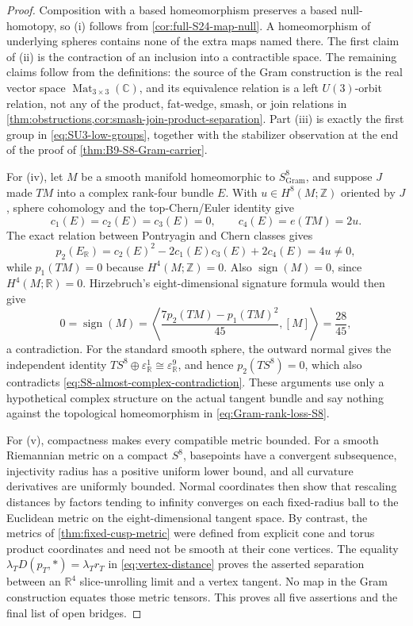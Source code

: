 \documentclass[11pt,letterpaper]{article}
\numberwithin{equation}{section}
\theoremstyle{definition}
\theoremstyle{remark}
\newcommand{\R}{\mathbb R}
\newcommand{\C}{\mathbb C}
\newcommand{\Z}{\mathbb Z}
\begin{document}
\begin{proof}
Composition with a based homeomorphism preserves a based null-homotopy,
so (i) follows from \cref{cor:full-S24-map-null}.  A homeomorphism of
underlying spheres contains none of the extra maps named there.  The first
claim of (ii) is the contraction of an inclusion into a contractible
space.  The remaining claims follow from the definitions: the source of
the Gram construction is the real vector space
\(\operatorname{Mat}_{3\times3}(\C)\), and its equivalence relation is a
left \(U(3)\)-orbit relation, not any of the product, fat-wedge, smash, or
join relations in
\cref{thm:obstructions,cor:smash-join-product-separation}.
Part (iii) is exactly the first group in
\cref{eq:SU3-low-groups}, together with the stabilizer observation at the
end of the proof of \cref{thm:B9-S8-Gram-carrier}.

For (iv), let \(M\) be a smooth manifold homeomorphic to
\(S^8_{\mathrm{Gram}}\), and suppose \(J\) made \(TM\) into a complex
rank-four bundle \(E\).  With \(u\in H^8(M;\Z)\) oriented by \(J\), sphere
cohomology and the top-Chern/Euler identity give
\[
 c_1(E)=c_2(E)=c_3(E)=0,
 \qquad c_4(E)=e(TM)=2u.
\]
The exact relation between Pontryagin and Chern classes gives
\begin{equation}
 p_2(E_\R)=c_2(E)^2-2c_1(E)c_3(E)+2c_4(E)=4u\ne0,
 \label{eq:S8-almost-complex-contradiction}
\end{equation}
while \(p_1(TM)=0\) because \(H^4(M;\Z)=0\).  Also
\(\operatorname{sign}(M)=0\), since \(H^4(M;\R)=0\).  Hirzebruch's
eight-dimensional signature formula would then give
\[
 0=\operatorname{sign}(M)
 =\left\langle\frac{7p_2(TM)-p_1(TM)^2}{45},[M]\right\rangle
 =\frac{28}{45},
\]
a contradiction.  For the standard smooth sphere, the outward normal
gives the independent identity
\(TS^8\oplus\varepsilon^1_\R\cong\varepsilon^9_\R\), and hence
\(p_2(TS^8)=0\), which also contradicts
\cref{eq:S8-almost-complex-contradiction}.  These arguments use only a
hypothetical complex structure on the actual tangent bundle and say
nothing against the topological homeomorphism in
\cref{eq:Gram-rank-loss-S8}.

For (v), compactness makes every compatible metric bounded.  For a smooth
Riemannian metric on a compact \(S^8\), basepoints have a convergent
subsequence, injectivity radius has a positive uniform lower bound, and all
curvature derivatives are uniformly bounded.  Normal coordinates then
show that rescaling distances by factors tending to infinity converges on
each fixed-radius ball to the Euclidean metric on the eight-dimensional
tangent space.  By contrast, the metrics of
\cref{thm:fixed-cusp-metric} were defined from explicit cone and torus
product coordinates and need not be smooth at their cone vertices.
The equality \(\lambda_TD(p_T,*)=\lambda_Tr_T\) in
\cref{eq:vertex-distance} proves the asserted separation between an
\(\R^4\) slice-unrolling limit and a vertex tangent.
No map in the Gram construction equates those metric tensors.  This proves
all five assertions and the final list of open bridges.
\end{proof}
\end{document}
